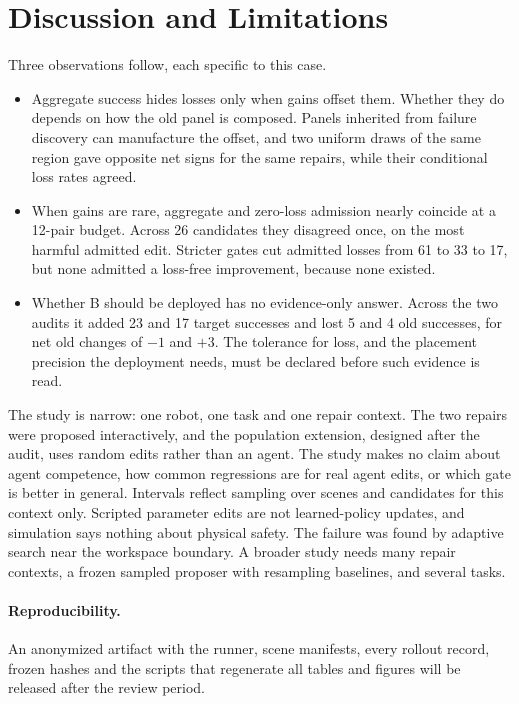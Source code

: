 \documentclass[letterpaper]{article} %
\begin{document}
\section{Discussion and Limitations}
Three observations follow, each specific to this case.
\begin{itemize}
\item Aggregate success hides losses only when gains offset them. Whether they do depends on how the old panel is composed. Panels inherited from failure discovery can manufacture the offset, and two uniform draws of the same region gave opposite net signs for the same repairs, while their conditional loss rates agreed.
\item When gains are rare, aggregate and zero-loss admission nearly coincide at a 12-pair budget. Across 26 candidates they disagreed once, on the most harmful admitted edit. Stricter gates cut admitted losses from 61 to 33 to 17, but none admitted a loss-free improvement, because none existed.
\item Whether B should be deployed has no evidence-only answer. Across the two audits it added 23 and 17 target successes and lost 5 and 4 old successes, for net old changes of $-1$ and $+3$. The tolerance for loss, and the placement precision the deployment needs, must be declared before such evidence is read.
\end{itemize}

The study is narrow: one robot, one task and one repair context. The two repairs were proposed interactively, and the population extension, designed after the audit, uses random edits rather than an agent. The study makes no claim about agent competence, how common regressions are for real agent edits, or which gate is better in general. Intervals reflect sampling over scenes and candidates for this context only. Scripted parameter edits are not learned-policy updates, and simulation says nothing about physical safety. The failure was found by adaptive search near the workspace boundary. A broader study needs many repair contexts, a frozen sampled proposer with resampling baselines, and several tasks.

\paragraph{Reproducibility.} An anonymized artifact with the runner, scene manifests, every rollout record, frozen hashes and the scripts that regenerate all tables and figures will be released after the review period.


\end{document}
